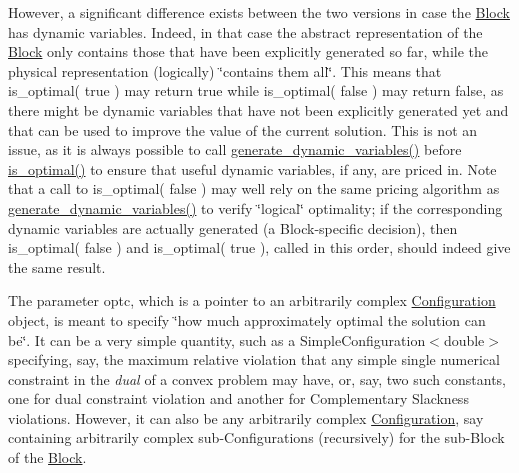 However, a significant difference exists between the two versions in case the \mbox{\hyperlink{class_s_m_spp__di__unipi__it_1_1_block}{Block}} has dynamic variables. Indeed, in that case the abstract representation of the \mbox{\hyperlink{class_s_m_spp__di__unipi__it_1_1_block}{Block}} only contains those that have been explicitly generated so far, while the physical representation (logically) \char`\"{}contains
them all\char`\"{}. This means that is\+\_\+optimal( true ) may return true while is\+\_\+optimal( false ) may return false, as there might be dynamic variables that have not been explicitly generated yet and that can be used to improve the value of the current solution. This is not an issue, as it is always possible to call \mbox{\hyperlink{class_s_m_spp__di__unipi__it_1_1_block_ab90d0f60518eee75370e29c95bae4522}{generate\+\_\+dynamic\+\_\+variables()}} before \mbox{\hyperlink{class_s_m_spp__di__unipi__it_1_1_block_a44ef42401ecae613574f3df619480de1}{is\+\_\+optimal()}} to ensure that useful dynamic variables, if any, are priced in. Note that a call to is\+\_\+optimal( false ) may well rely on the same pricing algorithm as \mbox{\hyperlink{class_s_m_spp__di__unipi__it_1_1_block_ab90d0f60518eee75370e29c95bae4522}{generate\+\_\+dynamic\+\_\+variables()}} to verify \char`\"{}logical\char`\"{} optimality; if the corresponding dynamic variables are actually generated (a Block-\/specific decision), then is\+\_\+optimal( false ) and is\+\_\+optimal( true ), called in this order, should indeed give the same result.

The parameter optc, which is a pointer to an arbitrarily complex \mbox{\hyperlink{class_s_m_spp__di__unipi__it_1_1_configuration}{Configuration}} object, is meant to specify \char`\"{}how much approximately optimal
the solution can be\char`\"{}. It can be a very simple quantity, such as a Simple\+Configuration$<$double$>$ specifying, say, the maximum relative violation that any simple single numerical constraint in the {\itshape dual} of a convex problem may have, or, say, two such constants, one for dual constraint violation and another for Complementary Slackness violations. However, it can also be any arbitrarily complex \mbox{\hyperlink{class_s_m_spp__di__unipi__it_1_1_configuration}{Configuration}}, say containing arbitrarily complex sub-\/\+Configurations (recursively) for the sub-\/\+Block of the \mbox{\hyperlink{class_s_m_spp__di__unipi__it_1_1_block}{Block}}.

